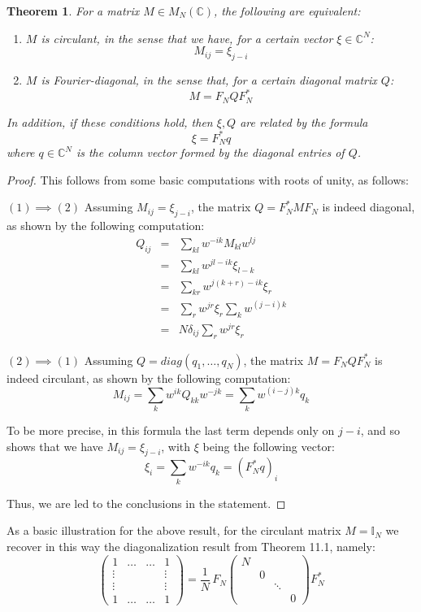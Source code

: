\documentclass[12pt]{amsbook}
\newtheorem{theorem}{Theorem}[chapter]
\begin{document}

\begin{theorem}
For a matrix $M\in M_N(\mathbb C)$, the following are equivalent:
\begin{enumerate}
\item $M$ is circulant, in the sense that we have, for a certain vector $\xi\in\mathbb C^N$:
$$M_{ij}=\xi_{j-i}$$

\item $M$ is Fourier-diagonal, in the sense that, for a certain diagonal matrix $Q$:
$$M=F_NQF_N^*$$
\end{enumerate}
In addition, if these conditions hold, then $\xi,Q$ are related by the formula
$$\xi=F_N^*q$$
where $q\in\mathbb C^N$ is the column vector formed by the diagonal entries of $Q$.
\end{theorem}

\begin{proof}
This follows from some basic computations with roots of unity, as follows:

\medskip

$(1)\implies(2)$ Assuming $M_{ij}=\xi_{j-i}$, the matrix $Q=F_N^*MF_N$ is indeed diagonal, as shown by the following computation:
\begin{eqnarray*}
Q_{ij}
&=&\sum_{kl}w^{-ik}M_{kl}w^{lj}\\
&=&\sum_{kl}w^{jl-ik}\xi_{l-k}\\
&=&\sum_{kr}w^{j(k+r)-ik}\xi_r\\
&=&\sum_rw^{jr}\xi_r\sum_kw^{(j-i)k}\\
&=&N\delta_{ij}\sum_rw^{jr}\xi_r
\end{eqnarray*}

$(2)\implies(1)$ Assuming $Q=diag(q_1,\ldots,q_N)$, the matrix $M=F_NQF_N^*$ is indeed circulant, as shown by the following computation:
$$M_{ij}
=\sum_kw^{ik}Q_{kk}w^{-jk}
=\sum_kw^{(i-j)k}q_k$$

To be more precise, in this formula the last term depends only on $j-i$, and so shows that we have $M_{ij}=\xi_{j-i}$, with $\xi$ being the following vector:
$$\xi_i
=\sum_kw^{-ik}q_k
=(F_N^*q)_i$$

Thus, we are led to the conclusions in the statement.
\end{proof}

As a basic illustration for the above result, for the circulant matrix $M=\mathbb I_N$ we recover in this way the diagonalization result from Theorem 11.1, namely:
$$\begin{pmatrix}
1&\ldots&\ldots&1\\
\vdots&&&\vdots\\
\vdots&&&\vdots\\
1&\ldots&\ldots&1\end{pmatrix}
=\frac{1}{N}\,F_N
\begin{pmatrix}
N\\
&0\\
&&\ddots\\
&&&0\end{pmatrix}F_N^*$$
\end{document}
